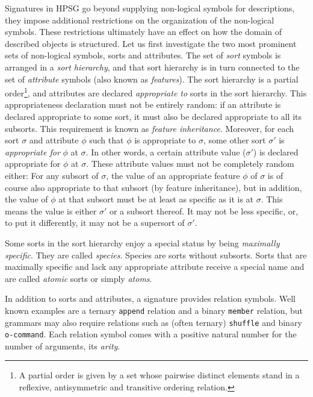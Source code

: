 \documentclass[output=paper
                ,modfonts
                ,nonflat
	        ,collection
	        ,collectionchapter
	        ,collectiontoclongg
 	        ,biblatex
                ,babelshorthands
                ,newtxmath
                ,draftmode
                ,colorlinks, citecolor=brown
]{./langsci/langscibook}
\begin{document}
{{Signatures in HPSG go beyond supplying non-logical symbols for
descriptions, they impose additional restrictions on the
organization of the non-logical symbols. These restrictions ultimately have an effect on
how the domain of described objects is structured. Let us first
investigate the two most prominent sets of non-logical symbols, sorts
and attributes. The set of \emph{sort} symbols is arranged in a
\emph{sort hierarchy}, and that sort hierarchy is in turn connected to
the set of \emph{attribute} symbols (also known as
\emph{features}). The sort hierarchy is a partial order\footnote{A partial order is given by a set whose pairwise distinct elements stand in a reflexive,
antisymmetric and transitive ordering relation.}, and
attributes are declared \emph{appropriate to} sorts
in the sort hierarchy. This appropriateness declaration must not be
entirely random: if an attribute is declared appropriate to some sort,
it must also be declared appropriate to all its subsorts. This requirement
is known as \emph{feature inheritance}.  Moreover, for each
sort $\sigma$ and attribute $\phi$ such that $\phi$ is appropriate to
$\sigma$, some other sort $\sigma'$ is \emph{appropriate for} $\phi$
at $\sigma$. In other words, a certain attribute value ($\sigma'$) is declared
appropriate for $\phi$ at $\sigma$. These attribute values must not be
completely random either: For any subsort of $\sigma$, the value of an
appropriate feature $\phi$ of $\sigma$ is of course also appropriate
to that subsort (by feature inheritance), but in addition, the value of $\phi$ at that subsort
must be at least as specific as it is at $\sigma$. This means the value is either
$\sigma'$ or a subsort thereof. It may not be less specific, or, to put
it differently, it may not be a
supersort of $\sigma'$.

Some sorts in the sort hierarchy enjoy a special status by being
\emph{maximally specific}. They are called \emph{species}. Species
are sorts without subsorts.
Sorts that are maximally specific and lack any appropriate attribute receive
a special name and are called \emph{atomic} sorts or simply \emph{atoms}.

In addition to sorts and attributes, a signature provides relation
symbols.  Well known examples are a ternary \texttt{append} relation
and a binary \texttt{member} relation, but grammars may also require
relations such as (often ternary) \texttt{shuffle} and binary
\texttt{o-command}. Each relation symbol comes with
a positive natural number for the number of arguments, its \emph{arity}.


}}
\end{document}
